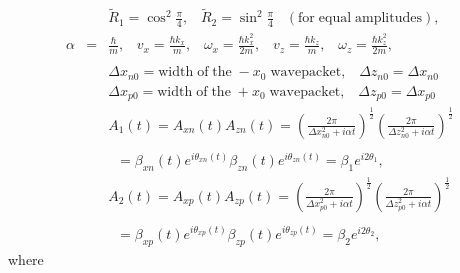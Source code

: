 \documentclass[12pt]{article}       %
\begin{document}
\begin{eqnarray}
&&\!\!\!\!\!\!\!\!\!\!\!\!\!\tilde{R}_{1}=\cos^2\frac{\pi}{4},\;\;\;\tilde{R}_{2}=\sin^2\frac{\pi}{4}\;\;\;\mathrm{(for\; equal\; amplitudes)},\nonumber\\
\alpha&=&\frac{\hbar}{m},\; \;\;v_x=\frac{\hbar k_x}{m}, \;\;\;\omega_x=\frac{\hbar k_x^2}{2m},\;\;\;v_z=\frac{\hbar k_z}{m}, \;\;\;\omega_z=\frac{\hbar k_z^2}{2m},\nonumber\\     \nonumber\\
&&\!\!\!\!\!\!\!\!\!\!\!\!\!\Delta x_{n0}=\mathrm{width \;of\; the}\;-x_0\;\mathrm{wavepacket}, \;\;\;\Delta z_{n0}=\Delta x_{n0}\nonumber\\
&&\!\!\!\!\!\!\!\!\!\!\!\!\!\Delta x_{p0}=\mathrm{width \;of\; the}\;+x_0\;\mathrm{wavepacket}, \;\;\;\Delta z_{p0}=\Delta x_{p0}\nonumber\\
&&\!\!\!\!\!\!\!\!\!\!\!\!\!A_1(t)=A_{xn}(t)A_{zn}(t)= \left(    \frac{2\pi}{\Delta x_{n0}^2+i\alpha t}   \right)^{\frac{1}{2}}\left(\frac{2\pi}{\Delta z_{n0}^2+i\alpha t}\right)^{\frac{1}{2}} \nonumber \\ \nonumber\\
&&\;\;=\beta_{xn} (t)e^{i\theta_{xn}(t)}\beta_{zn}(t)e^{i\theta_{zn}(t)}=\beta_1e^{ i2\theta_1}, \label{AA11}\\
&&\!\!\!\!\!\!\!\!\!\!\!\!\!A_2(t)=A_{xp}(t)A_{zp}(t)= \left(    \frac{2\pi}{\Delta x_{p0}^2+i\alpha t}   \right)^{\frac{1}{2}}\left(\frac{2\pi}{\Delta z_{p0}^2+i\alpha t}\right)^{\frac{1}{2}}  \nonumber\\ \nonumber\\
&&\;\;=\beta_{xp} (t)e^{i\theta_{xp}(t)}\beta_{zp}(t)e^{i\theta_{zp}(t)}=\beta_2 e^{ i2\theta_2}, \label{AA22}
\end{eqnarray}
where
\end{document}
